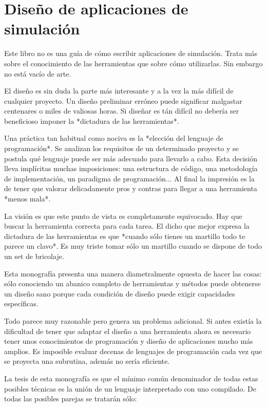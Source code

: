 \section{Diseño de aplicaciones de simulación}

Este libro no es una guía de cómo escribir aplicaciones de
simulación.  Trata más sobre el conocimiento de las herramientas
que sobre cómo utilizarlas.  Sin embargo no está vacío de
arte.

El diseño es sin duda la parte más interesante y a la vez la más
difícil de cualquier proyecto.  Un diseño preliminar erróneo
puede significar malgastar centenares o miles de valiosas
horas. Si diseñar es tán difícil no debería ser beneficioso
imponer la *dictadura de las herramientas*.

Una práctica tan habitual como nociva es la *elección del
lenguaje de programación*.  Se analizan los requisitos de un
determinado proyecto y se postula qué lenguaje puede ser más
adecuado para llevarlo a cabo.  Esta decisión lleva implícitas
muchas imposiciones: una estructura de código, una metodología de
implementación, un paradigma de programación...  Al final la
impresión es la de tener que valorar delicadamente pros y contras
para llegar a una herramienta *menos mala*.

La visión es que este punto de vista es completamente equivocado.
Hay que buscar la herramienta correcta para cada tarea.  El dicho
que mejor expresa la dictadura de las herramientas es que *cuando
sólo tienes un martillo todo te parece un clavo*.  Es muy triste
tomar sólo un martillo cuando se dispone de todo un set de
bricolaje.

Esta monografía presenta una manera diametralmente opuesta de
hacer las cosas: sólo conociendo un abanico completo de
herramientas y métodos puede obtenerse un diseño sano porque cada
condición de diseño puede exigir capacidades específicas.

Todo parece muy razonable pero genera un problema adicional.  Si antes
existía la dificultad de tener que adaptar el diseño a una herramienta
ahora es necesario tener unos conocimientos de programación y diseño
de aplicaciones mucho más amplios.  Es imposible evaluar decenas de
lenguajes de programación cada vez que se proyecta una subrutina,
además no sería eficiente.

La tesis de esta monografía es que el mínimo común denominador de
todas estas posibles técnicas es la unión de un lenguaje interpretado
con uno compilado.  De todas las posibles parejas se tratarán sólo:

